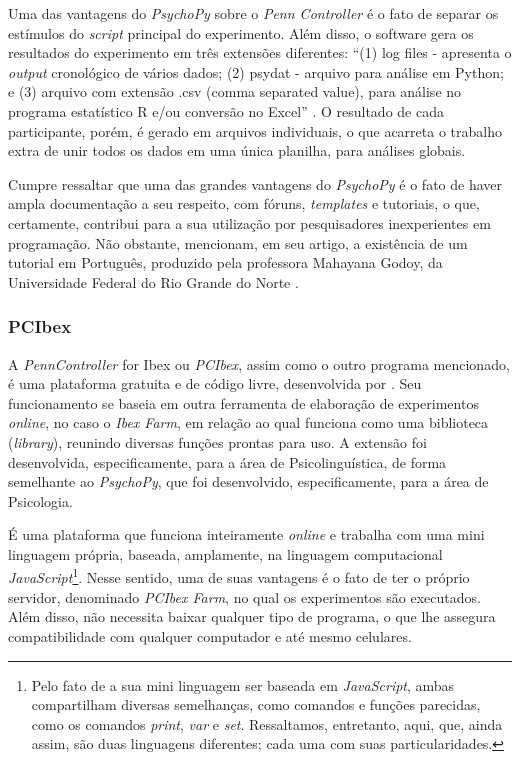 \documentclass{textolivre}
\begin{document}
Uma das vantagens do \emph{PsychoPy} sobre o \emph{Penn Controller} é o fato de separar os estímulos do \emph{script} principal do experimento. Além disso, o software gera os resultados do experimento em três extensões diferentes: “(1) log files - apresenta o \emph{output} cronológico de vários dados; (2) psydat - arquivo para análise em Python; e (3) arquivo com extensão .csv (comma separated value), para análise no programa estatístico R e/ou conversão no Excel” \cite[p. 667]{limberger2019}. O resultado de cada participante, porém, é gerado em arquivos individuais, o que acarreta o trabalho extra de unir todos os dados em uma única planilha, para análises globais.

Cumpre ressaltar que uma das grandes vantagens do \emph{PsychoPy} é o fato de haver ampla documentação a seu respeito, com fóruns, \emph{templates} e tutoriais, o que, certamente, contribui para a sua utilização por pesquisadores inexperientes em programação. Não obstante, \textcite[p. 682]{limberger2019} mencionam, em seu artigo, a existência de um tutorial em Português, produzido pela professora Mahayana Godoy, da Universidade Federal do Rio Grande do Norte \cite{tutorial}.

\subsubsection{PCIbex}
A \emph{PennController} for Ibex ou \emph{PCIbex}, assim como o outro programa mencionado, é uma plataforma gratuita e de código livre, desenvolvida por \textcite{zehr2018}. Seu funcionamento se baseia em outra ferramenta de elaboração de experimentos \textit{online}, no caso o \emph{Ibex Farm}, em relação ao qual funciona como uma biblioteca (\emph{library}), reunindo diversas funções prontas para uso. A extensão foi desenvolvida, especificamente, para a área de Psicolinguística, de forma semelhante ao \emph{PsychoPy}, que foi desenvolvido, especificamente, para a área de Psicologia.

É uma plataforma que funciona inteiramente \textit{online} e trabalha com uma mini linguagem própria, baseada, amplamente, na linguagem computacional \emph{JavaScript}\footnote{Pelo fato de a sua mini linguagem ser baseada em \emph{JavaScript}, ambas compartilham diversas semelhanças, como comandos e funções parecidas, como os comandos \emph{print}, \emph{var} e \emph{set}. Ressaltamos, entretanto, aqui, que, ainda assim, são duas linguagens diferentes; cada uma com suas particularidades.}. Nesse sentido, uma de suas vantagens é o fato de ter o próprio servidor, denominado \emph{PCIbex Farm}, no qual os experimentos são executados. Além disso, não necessita baixar qualquer tipo de programa, o que lhe assegura compatibilidade com qualquer computador e até mesmo celulares.
\end{document}
